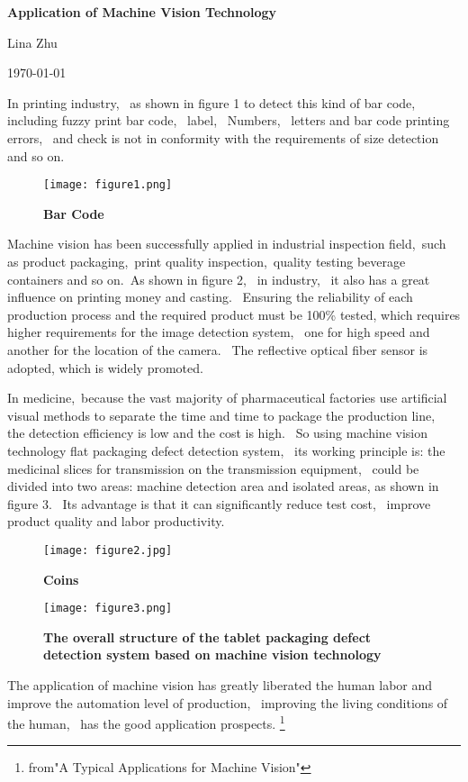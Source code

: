 \documentclass{article}
\begin{document}
	
	\begin{center}
		
		{\bfseries \LARGE Application of Machine Vision Technology} 
		
	\end{center}
	\begin{center}
		Lina Zhu
	\end{center}
	\begin{center}
		\today
	\end{center}
	
	\par  In printing industry,~ as shown in figure 1 to detect this kind of bar code,~ including fuzzy print bar code,~ label,~ Numbers,~ letters and bar code printing errors,~ and check is not in conformity with the requirements of size detection and so on.
\begin{figure}[htp]
	\centering
	\texttt{[image: figure1.png]}
	\caption{\bfseries{Bar Code}}\label{pic1}
		\end{figure}
	\par Machine vision has been successfully applied in industrial inspection field,~such as product packaging,~print quality inspection,~quality testing beverage containers and so on.~As shown in figure 2,~ in industry, ~it also has a great influence on printing money and casting.~ Ensuring the reliability of each production process and the required product must be 100\% tested, which requires higher requirements for the image detection system, ~one for high speed and another for the location of the camera.~ The reflective optical fiber sensor is adopted, which is widely promoted.
	\par In medicine,~because the vast majority of pharmaceutical factories use artificial visual methods to separate the time and time to package the production line,~ the detection efficiency is low and the cost is high.~ So using machine vision technology flat packaging defect detection system, ~its working principle is: the medicinal slices for transmission on the transmission equipment, ~could be divided into two areas: machine detection area and isolated areas, as shown in figure 3. ~Its advantage is that it can significantly reduce test cost, ~improve product quality and labor productivity.
	\begin{figure}[htp]
		\centering
		\texttt{[image: figure2.jpg]}
		\caption{\bfseries{Coins}}\label{pic2}
			\centering
		\texttt{[image: figure3.png]}
		\caption{	\bfseries{The overall structure of the tablet packaging defect detection system based on machine vision technology}}\label{pic3}
	
	\end{figure}
	\par The application of machine vision has greatly liberated the human labor and improve the automation level of production, ~improving the living conditions of the human,~ has the good application prospects. 
	\footnote{from"A Typical Applications for Machine Vision"} 
	
\end{document}
